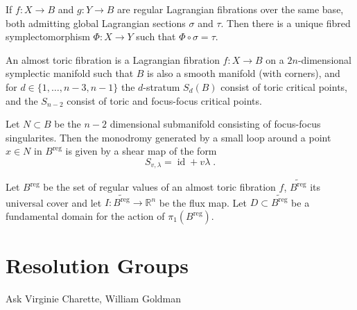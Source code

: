 \documentclass[12pt,a4paper,abstract=true,draft]{scrartcl}
\DeclareMathOperator{\id}{id}
\begin{document}
\begin{lemma}
  If $f \colon X → B$ and $g \colon Y → B$ are regular Lagrangian fibrations over the same base, both admitting global Lagrangian sections $σ$ and $τ$.
  Then there is a unique fibred symplectomorphism $Φ \colon X → Y$ such that $Φ ∘ σ = τ$.
\end{lemma}


\begin{definition}
  An almost toric fibration is a Lagrangian fibration $f \colon X → B$ on a $2n$-dimensional symplectic manifold such that $B$ is also a smooth manifold (with corners), and for $d ∈ \{1,…,n-3,n-1\}$ the $d$-stratum $S_d(B)$ consist of toric critical points, and the $S_{n-2}$ consist of toric and focus-focus critical points.
\end{definition}

\begin{lemma}
  Let $N ⊂ B$ be the $n-2$ dimensional submanifold consisting of focus-focus singularites. Then the monodromy generated by a small loop around a point $x ∈ N$ in $B^\text{reg}$ is given by a shear map of the form
  \[
    S_{v,λ} = \id + vλ \; .
  \]
\end{lemma}

Let $B^\text{reg}$ be the set of regular values of an almost toric fibration $f$, $\tilde{B^\text{reg}}$ its universal cover and let $I \colon \tilde{B^\text{reg}} → ℝ^n$ be the flux map. Let $D ⊂ \tilde{B^\text{reg}}$ be a fundamental domain for the action of $π_1(B^\text{reg})$.

\section{Resolution Groups}

Ask Virginie Charette, William Goldman
\end{document}
